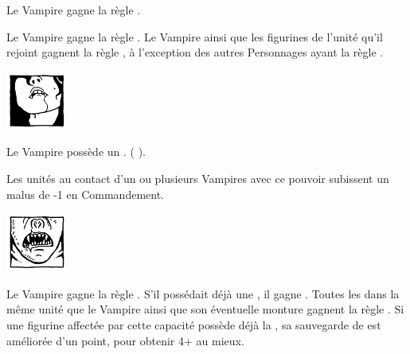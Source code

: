 \begin{multicols}{2}
\vspace*{-0.2cm}
\startpricelist

 Le Vampire gagne la règle .

 Le Vampire gagne la règle \awaken{\zombies{}, \direwolves{}, \batswarms{}, \greatbats{}}. Le Vampire ainsi que les figurines de l'unité qu'il rejoint gagnent la règle \swiftstride{}, à l'exception des autres Personnages ayant la règle \vampiric{}.

\endpricelist

\begin{center}\includegraphics[width=2cm]{pics/logo_lamia.png}\end{center}
\vspace*{-1.5cm}

\vspace*{-0.2cm}
\startpricelist

 Le Vampire possède un . \lustspellfour{} (\Pathof{} \lust{}).

 Les unités au contact d'un ou plusieurs Vampires avec ce pouvoir subissent un malus de -1 en Commandement.

\endpricelist
\columnbreak

\begin{center}\includegraphics[width=2cm]{pics/logo_strigoi.png}\end{center}
\vspace*{-1.5cm}

\vspace*{-0.2cm}
\startpricelist

 Le Vampire gagne la règle . S'il possédait déjà une \regeneration{}, il gagne . Toutes les \ghouls{} dans la même unité que le Vampire ainsi que son éventuelle monture gagnent la règle . Si une figurine affectée par cette capacité possède déjà la \regeneration{}, sa sauvegarde de \regeneration{} est améliorée d'un point, pour obtenir 4+ au mieux.


\end{multicols}
